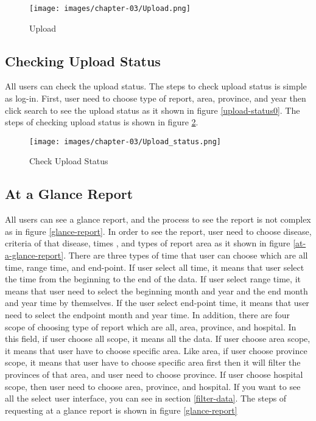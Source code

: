 	\FloatBarrier
    	\begin{figure}[h!]
            \centering
        		\texttt{[image: images/chapter-03/Upload.png]}
        		\caption{Upload}
        		\label{activity_upload}
        \end{figure}
	\FloatBarrier
	
	\subsection{Checking Upload Status} \label{check_upload_status_activity_diagram}
	All users can check the upload status. The steps to check upload status is simple as log-in. First, user need to choose type of report, area, province, and year then click search to see the upload status as it shown in figure \ref{upload-status0}. The steps of checking upload status is shown in figure \ref{check-upload-status}.
	
	\FloatBarrier
    	\begin{figure}[h!]
            \centering
        		\texttt{[image: images/chapter-03/Upload\_status.png]}
        		\caption{Check Upload Status}
        		\label{check-upload-status}
        \end{figure}
	\FloatBarrier
	
	\subsection{At a Glance Report} \label{at_a_glance_report}
	All users can see a glance report, and the process to see the report is not complex as in figure \ref{glance-report}. In order to see the report, user need to choose disease, criteria of that disease, times , and types of report area as it shown in figure \ref{at-a-glance-report}. There are three types of time that user can choose which are all time, range time, and end-point. If user select all time, it means that user select the time from the beginning to the end of the data. If user select range time, it means that user need to select the beginning month and year and the end month and year time by themselves. If the user select end-point time, it means that user need to select the endpoint month and year time. In addition, there are four scope of choosing type of report which are all, area, province, and hospital. In this field, if user choose all scope, it means all the data. If user choose area scope, it means that user have to choose specific area. Like area, if user choose province scope, it means that user have to choose specific area first then it will filter the provinces of that area, and user need to choose province. If user choose hospital scope, then user need to choose area, province, and hospital. If you want to see all the select user interface, you can see in section \ref{filter-data}. The steps of requesting at a glance report is shown in figure \ref{glance-report}
	
